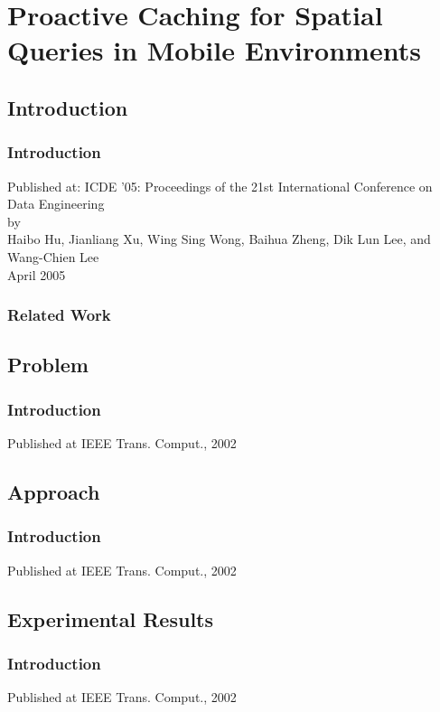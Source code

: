 \section{Proactive Caching for Spatial Queries in Mobile Environments}

\subsection{Introduction}

\begin{frame}
\frametitle{Introduction}
	\begin{center}
	\Large
	Published at: ICDE '05: Proceedings of the 21st International Conference on Data Engineering\\\vspace{1em}
	by\\\vspace{1em}
	Haibo Hu, Jianliang Xu, Wing Sing Wong, Baihua Zheng, Dik Lun Lee, and Wang-Chien Lee\\\vspace{1em}
	April 2005
	\end{center}
\end{frame}


\begin{frame}
\frametitle{Related Work}



\end{frame}


\subsection{Problem}

\begin{frame}
\frametitle{Introduction}

Published at IEEE Trans. Comput., 2002


\end{frame}

\subsection{Approach}

\begin{frame}
\frametitle{Introduction}

Published at IEEE Trans. Comput., 2002


\end{frame}

\subsection{Experimental Results}

\begin{frame}
\frametitle{Introduction}

Published at IEEE Trans. Comput., 2002


\end{frame}